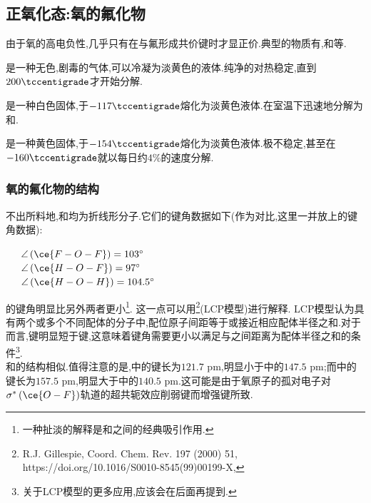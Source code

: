 \documentclass{ctexart}
\begin{document}
\subsection{正氧化态:氧的氟化物}
由于氧的高电负性,几乎只有在与氟形成共价键时才显正价.典型的物质有,和等.
\begin{substance}[\ce{OF2}]
    是一种无色,剧毒的气体,可以冷凝为淡黄色的液体.纯净的对热稳定,直到$200\tccentigrade$才开始分解.
\end{substance}
\begin{substance}[\ce{HOF}]
    是一种白色固体,于$-117\tccentigrade$熔化为淡黄色液体.在室温下迅速地分解为和.
\end{substance}
\begin{substance}[\ce{O2F2}]
    是一种黄色固体,于$-154\tccentigrade$熔化为淡黄色液体.极不稳定,甚至在$-160\tccentigrade$就以每日约$4\%$的速度分解.
\end{substance}
\subsubsection{氧的氟化物的结构} 不出所料地,和均为折线形分子.它们的键角数据如下(作为对比,这里一并放上的键角数据):
\begin{center}
    \ \ \ $\angle\left(\ce{F-O-F}\right)=103^\circ$\\
    \ \ \ $\angle\left(\ce{H-O-F}\right)=97^\circ$\\
    \ \ \ $\angle\left(\ce{H-O-H}\right)=104.5^\circ$
\end{center}

\indent {}的键角明显比另外两者更小\footnote{一种扯淡的解释是和之间的经典吸引作用.}.%
这一点可以用\footnote{R.J. Gillespie, Coord. Chem. Rev. 197 (2000) 51, https://doi.org/10.1016/S0010-8545(99)00199-X,}(LCP模型)进行解释.%
LCP模型认为具有两个或多个不同配体的分子中,配位原子间距等于或接近相应配体半径之和.对于而言,键明显短于键,这意味着键角需要更小以满足与之间距离为配体半径之和的条件\footnote{关于LCP模型的更多应用,应该会在后面再提到.}.\\
\indent {}和的结构相似.值得注意的是,中的键长为$121.7\text{ pm}$,明显小于中的$147.5\text{ pm}$;而中的键长为$157.5\text{ pm}$,明显大于中的$140.5\text{ pm}$.这可能是由于氧原子的孤对电子对$\sigma^\ast\left(\ce{O-F}\right)$轨道的超共轭效应削弱键而增强键所致.
\end{document}
